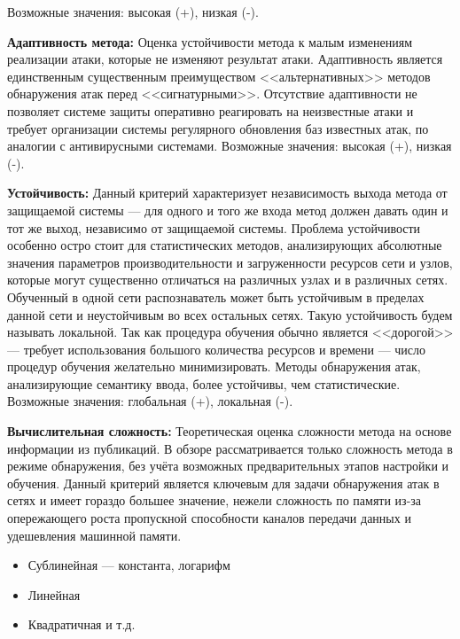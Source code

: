 Возможные значения: высокая (+), низкая (-).

\textbf{Адаптивность метода:} Оценка устойчивости метода к малым изменениям реализации атаки, которые не изменяют результат атаки. Адаптивность является единственным существенным преимуществом <<альтернативных>> методов обнаружения атак перед <<сигнатурными>>. Отсутствие адаптивности не позволяет системе защиты оперативно реагировать на неизвестные атаки и требует организации системы регулярного обновления баз известных атак, по аналогии с антивирусными системами. Возможные значения: высокая (+), низкая (-).

\textbf{Устойчивость:} Данный критерий характеризует независимость выхода метода от защищаемой системы --- для одного и того же входа метод должен давать один и тот же выход, независимо от защищаемой системы. Проблема устойчивости особенно остро стоит для статистических методов, анализирующих абсолютные значения параметров производительности и загруженности ресурсов сети и узлов, которые могут существенно отличаться на различных узлах и в различных сетях. Обученный в одной сети распознаватель может быть устойчивым в пределах данной сети и неустойчивым во всех остальных сетях. Такую устойчивость будем называть локальной. Так как процедура обучения обычно является <<дорогой>> --- требует использования большого количества ресурсов и времени --- число процедур обучения желательно минимизировать. Методы обнаружения атак, анализирующие семантику ввода, более устойчивы, чем статистические. Возможные значения: глобальная (+), локальная (-).


\textbf{Вычислительная сложность:} Теоретическая оценка сложности метода на основе информации из публикаций. В обзоре рассматривается только сложность метода в режиме обнаружения, без учёта возможных предварительных этапов настройки и обучения. Данный критерий является ключевым для задачи обнаружения атак в сетях и имеет гораздо большее значение, нежели сложность по памяти из-за опережающего роста пропускной способности каналов передачи данных и удешевления машинной памяти.

\begin{itemize}

\item Сублинейная --- константа, логарифм

\item Линейная

\item Квадратичная и т.д.

\end{itemize}


